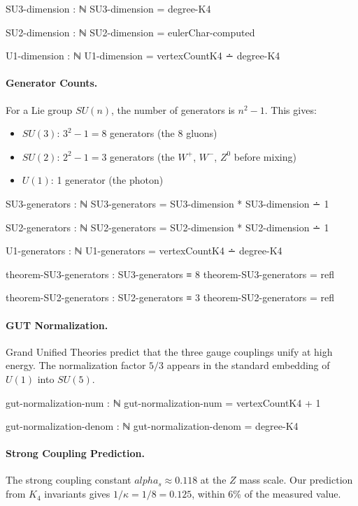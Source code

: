 \documentclass[11pt,a4paper]{book}
\def\alpha{alpha}%
\begin{document}
\begin{code}
SU3-dimension : ℕ
SU3-dimension = degree-K4

SU2-dimension : ℕ
SU2-dimension = eulerChar-computed

U1-dimension : ℕ
U1-dimension = vertexCountK4 ∸ degree-K4
\end{code}

\paragraph{Generator Counts.}
For a Lie group $SU(n)$, the number of generators is $n^2 - 1$. This gives:
\begin{itemize}
\item $SU(3)$: $3^2 - 1 = 8$ generators (the 8 gluons)
\item $SU(2)$: $2^2 - 1 = 3$ generators (the $W^+$, $W^-$, $Z^0$ before mixing)
\item $U(1)$: 1 generator (the photon)
\end{itemize}

\begin{code}
SU3-generators : ℕ
SU3-generators = SU3-dimension * SU3-dimension ∸ 1

SU2-generators : ℕ
SU2-generators = SU2-dimension * SU2-dimension ∸ 1


U1-generators : ℕ
U1-generators = vertexCountK4 ∸ degree-K4

theorem-SU3-generators : SU3-generators ≡ 8
theorem-SU3-generators = refl

theorem-SU2-generators : SU2-generators ≡ 3
theorem-SU2-generators = refl
\end{code}

\paragraph{GUT Normalization.}
Grand Unified Theories predict that the three gauge couplings unify at high energy. 
The normalization factor $5/3$ appears in the standard embedding of $U(1)$ into $SU(5)$.

\begin{code}
gut-normalization-num : ℕ
gut-normalization-num = vertexCountK4 + 1

gut-normalization-denom : ℕ
gut-normalization-denom = degree-K4
\end{code}

\paragraph{Strong Coupling Prediction.}
The strong coupling constant $\alpha_s \approx 0.118$ at the $Z$ mass scale. Our prediction 
from $K_4$ invariants gives $1/\kappa = 1/8 = 0.125$, within 6\% of the measured value.
\end{document}
